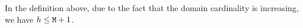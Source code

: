 \documentclass{lmcs}
\newtheorem{lemma}[theorem]{Lemma}
\begin{document}
In the definition above, due to the fact that the domain cardinality is increasing,
we have $h \le {\tt M}+1$.



%
%

%

\end{document}
